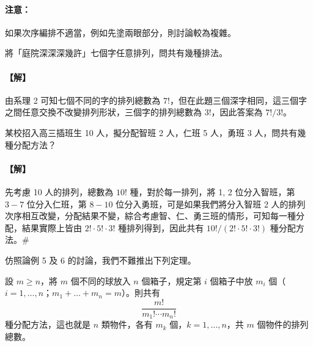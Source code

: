 \vspace{0.5em}
\paragraph{注意：}
如果次序編排不適當，例如先塗兩眼部分，則討論較為複雜。

\vspace{1em}
\begin{discussion}\label{disc:b5s-2-5}
將「庭院深深深幾許」七個字任意排列，問共有幾種排法。
\end{discussion}
\paragraph{【解】}
由系理 2 可知七個不同的字的排列總數為 $7!$，但在此題三個深字相同，這三個字之間任意交換不改變排列形狀，三個字的排列總數為 $3!$，因此答案為 $7!/3!$。

\vspace{1em}
\begin{discussion}\label{disc:b5s-2-6}
某校招入高三插班生 10 人，擬分配智班 2 人，仁班 5 人，勇班 3 人，問共有幾種分配方法？
\end{discussion}
\paragraph{【解】}
先考慮 10 人的排列，總數為 $10!$ 種，對於每一排列，將 1, 2 位分入智班，第 $3 - 7$ 位分入仁班，第 $8 - 10$ 位分入勇班，可是如果我們將分入智班 2 人的排列次序相互改變，分配結果不變，綜合考慮智、仁、勇三班的情形，可知每一種分配，結果實際上皆由 $2! \cdot 5! \cdot 3!$ 種排列得到，因此共有 $10! / (2! \cdot 5! \cdot 3!)$ 種分配方法。\hfill\#

仿照論例 5 及 6 的討論，我們不難推出下列定理。

\begin{theorem}\label{thm:b5s-2-6}
設 $m \ge n$，將 $m$ 個不同的球放入 $n$ 個箱子，規定第 $i$ 個箱子中放 $m_i$ 個（$i=1, \dots, n$；$m_1 + \dots + m_n = m$）。則共有
\begin{equation}
\frac{m!}{m_1! \cdots m_n!}
\end{equation}
種分配方法，這也就是 $n$ 類物件，各有 $m_k$ 個，$k=1, \dots, n$，共 $m$ 個物件的排列總數。
\end{theorem}

